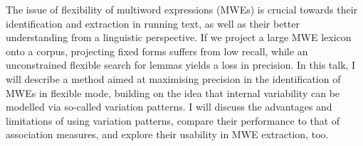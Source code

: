 The issue of flexibility of multiword expressions (MWEs) is crucial towards their identification and extraction in running text, as well as their better
 understanding from a linguistic perspective. If we project a large MWE lexicon
 onto a corpus, projecting fixed forms suffers from low recall, while an
 unconstrained flexible search for lemmas yields a loss in precision. In this
 talk, I will describe a method aimed at maximising precision in the
 identification of MWEs in flexible mode, building on the idea that internal
 variability can be modelled via so-called variation patterns. I will discuss
 the advantages and limitations of using variation patterns, compare their
 performance to that of association measures, and explore their usability in MWE
 extraction, too.

